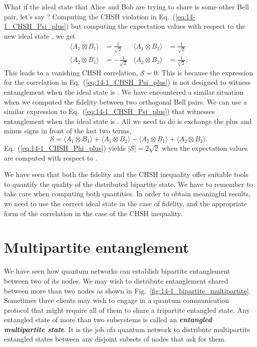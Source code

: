 What if the ideal state that Alice and Bob are trying to share is some other Bell pair, let's say \ket{\Phi^+}?
Computing the CHSH violation in Eq.~(\ref{eq:14-1_CHSH_Psi_plus}) but computing the expectation values with respect to the new ideal state \ket{\Phi^+}, we get
\begin{align}
    \langle A_1 \otimes B_1 \rangle & = \frac{1}{\sqrt{2}} & \langle A_1 \otimes B_2 \rangle & = \frac{1}{\sqrt{2}} \\
    \langle A_2 \otimes B_1 \rangle & = - \frac{1}{\sqrt{2}} & \langle A_2 \otimes B_2 \rangle & = \frac{1}{\sqrt{2}}.
\end{align}
This leads to a vanishing CHSH correlation, $\mathcal{S} = 0$.
This is because the expression for the correlation in Eq.~(\ref{eq:14-1_CHSH_Psi_plus}) is not designed to witness entanglement when the ideal state is \ket{\Phi^+}.
We have encountered a similar situation when we computed the fidelity between two orthogonal Bell pairs.
We can use a similar expression to Eq.~(\ref{eq:14-1_CHSH_Psi_plus}) that witnesses entanglement when the ideal state is \ket{\Phi^+}.
All we need to do is exchange the plus and minus signs in front of the last two terms,
\begin{equation}
    \mathcal{S} = \langle A_1 \otimes B_1\rangle + \langle A_1 \otimes B_2\rangle - \langle A_2 \otimes B_1\rangle + \langle A_2 \otimes B_2\rangle.
    \label{eq:14-1_CHSH_Phi_plus}
\end{equation}
Eq.~(\ref{eq:14-1_CHSH_Phi_plus}) yields $|\mathcal{S}| = 2\sqrt{2}$ when the expectation values are computed with respect to \ket{\Phi^+}.

We have seen that both the fidelity and the CHSH inequality offer suitable tools to quantify the quality of the distributed bipartite state.
We have to remember to take care when computing both quantities.
In order to obtain meaningful results, we need to use the correct ideal state in the case of fidelity, and the appropriate form of the correlation in the case of the CHSH inequality.



\section{Multipartite entanglement}
\label{sec:14-2_multipartite}

We have seen how quantum networks can establish bipartite entanglement between two of its nodes.
We may wish to distribute entanglement shared between more than two nodes as shown in Fig.~\ref{fig:14-1_bipartite_multipartite}.
Sometimes three clients may wish to engage in a quantum communication protocol that might require all of them to share a tripartite entangled state.
Any entangled state of more than two subsystems is called an \textit{\textbf{entangled multipartite state}}.
It is the job ofa quantum network to distribute multipartite entangled states between any disjoint subsets of nodes that ask for them.

